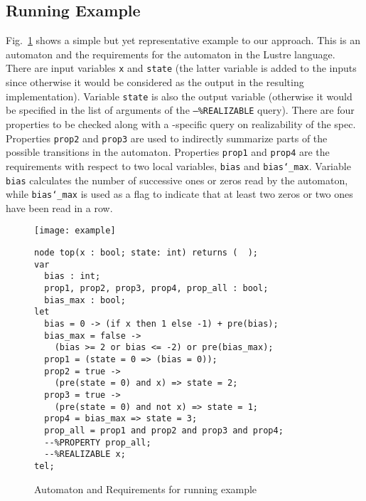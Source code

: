 
 \subsection{Running Example}
 
 
 Fig.~\ref{fg:example} shows a
 simple but yet representative example to our approach.
 This is an automaton and the requirements for the automaton in the Lustre language.
 There are input variables \texttt{x} and \texttt{state} (the latter variable is added to the inputs since
 otherwise it would be considered as the output in the resulting implementation).
 Variable \texttt{state} is also the output variable (otherwise it would be specified in the list of arguments of the \texttt{--\%REALIZABLE} query).
 There are four properties to be checked along with a
 \jkind-specific query on realizability of the spec. Properties
 \texttt{prop2} and \texttt{prop3} are used to indirectly summarize parts of the
 possible transitions in the automaton. Properties \texttt{prop1} and
 \texttt{prop4} are the requirements with respect to two local variables, \texttt{bias}
 and \texttt{bias\char`_max}. Variable \texttt{bias} calculates the number of successive
 ones or zeros read by the automaton, while \texttt{bias\char`_max} is used as a flag
 to indicate that at least two zeros or two ones have been read in a row.
 
\begin{figure}[H]
\begin{minipage}[c]{0.35\textwidth}
\centering
\texttt{[image: example]}
\end{minipage}
\begin{minipage}[c]{0.7\textwidth}
 \begin{Verbatim}[fontsize=\scriptsize]
node top(x : bool; state: int) returns (  );
var
  bias : int;
  prop1, prop2, prop3, prop4, prop_all : bool;
  bias_max : bool;
let
  bias = 0 -> (if x then 1 else -1) + pre(bias);
  bias_max = false ->
	(bias >= 2 or bias <= -2) or pre(bias_max);
  prop1 = (state = 0 => (bias = 0));
  prop2 = true ->
  	(pre(state = 0) and x) => state = 2;
  prop3 = true ->
  	(pre(state = 0) and not x) => state = 1;
  prop4 = bias_max => state = 3;
  prop_all = prop1 and prop2 and prop3 and prop4;
  --%PROPERTY prop_all;
  --%REALIZABLE x;
tel;
 \end{Verbatim}
\end{minipage}
\caption{Automaton and Requirements for running example}
\label{fg:example}
\end{figure}

